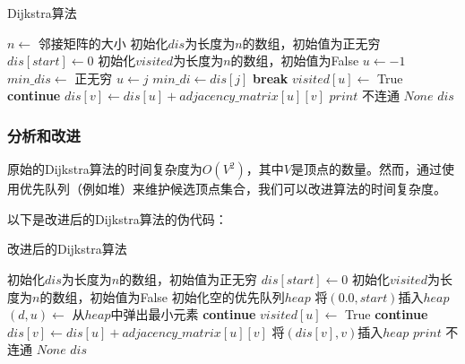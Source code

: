 \documentclass[lang=cn,11pt,a4paper]{elegantpaper}
\begin{document}
\begin{algorithm}[H]
\caption{Dijkstra算法}
\begin{algorithmic}[1]
    \State $n \leftarrow$ 邻接矩阵的大小
    \State 初始化$dis$为长度为$n$的数组，初始值为正无穷 
    \State $dis[start] \leftarrow 0$
    \State 初始化$visited$为长度为$n$的数组，初始值为False
        \State $u \leftarrow -1$
        \State $min\_dis \leftarrow$ 正无穷
                \State $u \leftarrow j$
                \State $min\_di \leftarrow dis[j]$
            \EndIf
        \EndFor
                \State \textbf{break}
            \EndIf
            \State $visited[u] \leftarrow$ True
                \State \textbf{continue}
            \EndIf
                \State $dis[v] \leftarrow dis[u] + adjacency\_matrix[u][v]$
            \EndIf
        \EndFor
    \EndFor
        \State $print$ 不连通
        \State \Return $None$
    \EndIf
    \State \Return $dis$
\EndProcedure
\end{algorithmic}
\end{algorithm}

\subsubsection{分析和改进}
原始的Dijkstra算法的时间复杂度为$O(V^2)$，其中$V$是顶点的数量。然而，通过使用优先队列（例如堆）来维护候选顶点集合，我们可以改进算法的时间复杂度。

以下是改进后的Dijkstra算法的伪代码：

\begin{algorithm}[H]
\caption{改进后的Dijkstra算法}
\begin{algorithmic}[1]
    \State 初始化$dis$为长度为$n$的数组，初始值为正无穷
    \State $dis[start] \leftarrow 0$
    \State 初始化$visited$为长度为$n$的数组，初始值为False
    \State 初始化空的优先队列$heap$
    \State 将$(0.0, start)$插入$heap$
        \State $(d, u) \leftarrow$ 从$heap$中弹出最小元素
            \State \textbf{continue}
        \EndIf
        \State $visited[u] \leftarrow$ True
                \State \textbf{continue}
            \EndIf
                \State $dis[v] \leftarrow dis[u] + adjacency\_matrix[u][v]$
                \State 将$(dis[v], v)$插入$heap$
            \EndIf
        \EndFor
    \EndWhile
        \State $print$ 不连通
        \State \Return $None$
    \EndIf
    \State \Return $dis$
\EndProcedure
\end{algorithmic}
\end{algorithm}
\end{document}
